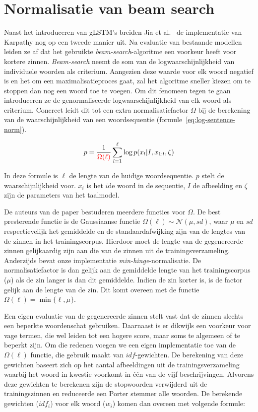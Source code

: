 \section{Normalisatie van beam search}
Naast het introduceren van gLSTM's breiden Jia et al.~\cite{Fernando2015} de implementatie van Karpathy nog op een tweede manier uit. Na evaluatie van bestaande modellen leiden ze af dat het gebruikte \emph{beam-search}-algoritme een voorkeur heeft voor kortere zinnen. \emph{Beam-search} neemt de som van de logwaarschijnlijkheid van individuele woorden als criterium. Aangezien deze waarde voor elk woord negatief is en het om een maximalisatieproces gaat, zal het algoritme sneller kiezen om te stoppen dan nog een woord toe te voegen. Om dit fenomeen tegen te gaan introduceren ze de genormaliseerde logwaarschijnlijkheid van elk woord als criterium. Concreet leidt dit tot een extra normalisatiefactor $\Omega$ bij de berekening van de waarschijnlijkheid van een woordsequentie (formule~\eqref{eq:log-sentence-norm}).

\begin{equation}
p = \frac{1}{\color{red}{\Omega(\ell)}}\sum_{l=1}^{\ell} \log p(x_l | I, x_{1:l}, \zeta)
\label{eq:log-sentence-norm}
\end{equation}

In deze formule is $\ell$ de lengte van de huidige woordsequentie. $p$ stelt de waarschijnlijkheid voor. $x_i$ is het $i$de woord in de sequentie, $I$ de afbeelding en $\zeta$ zijn de parameters van het taalmodel. 

De auteurs van de paper bestuderen meerdere functies voor $\Omega$. 
De best presterende functie is de Gaussiaanse functie $\Omega(\ell) \sim \mathcal{N}(\mu, sd)$, waar $\mu$ en $sd$ respectievelijk het gemiddelde en de standaardafwijking zijn van de lengtes van de zinnen in het trainingscorpus. Hierdoor moet de lengte van de gegenereerde zinnen gelijkaardig zijn aan die van de zinnen uit de trainingsverzameling. 
Anderzijds bevat onze implementatie \emph{min-hinge}-normalisatie. De normalisatiefactor is dan gelijk aan de gemiddelde lengte van het trainingscorpus ($\mu$) als de zin langer is dan dit gemiddelde. Indien de zin korter is, is de factor gelijk aan de lengte van de zin. Dit komt overeen met de functie $\Omega(\ell)=\min\{\ell, \mu\}$.

Een eigen evaluatie van de gegenereerde zinnen stelt vast dat de zinnen slechts een beperkte woordenschat gebruiken. Daarnaast is er dikwijls een voorkeur voor vage termen, die wel leiden tot een hogere score, maar soms te algemeen of te beperkt zijn.
Om die redenen voegen we een eigen implementatie toe van de $\Omega(\ell)$ functie, die gebruik maakt van $idf$-gewichten. De berekening van deze gewichten baseert zich op het aantal afbeeldingen uit de trainingsverzameling waarbij het woord in kwestie voorkomt in \'e\'en van de vijf beschrijvingen. Alvorens deze gewichten te berekenen zijn de stopwoorden verwijderd uit de trainingszinnen en reduceerde een Porter stemmer alle woorden. De berekende gewichten ($idf_i$) voor elk woord ($w_i$) komen dan overeen met volgende formule: 


